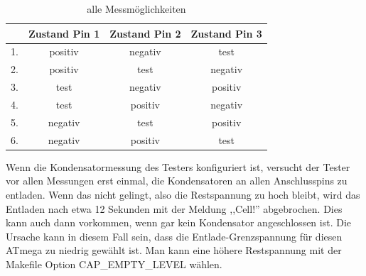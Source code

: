 \begin{table}[H]
  \begin{center}
    \begin{tabular}{| l | c | c | c |}
    \hline
      & Zustand Pin 1 & Zustand Pin 2 & Zustand Pin 3 \\
    \hline
   1. & positiv    &  negativ   &  test \\
   2. & positiv    &  test      & negativ \\
   3. & test       &  negativ   & positiv \\
   4. & test       &  positiv   & negativ \\
   5. & negativ    &  test      & positiv \\
   6. & negativ    &  positiv   &  test  \\
    \hline
    \end{tabular}
  \end{center}
  \caption{alle Messmöglichkeiten}
  \label{tab:case} 
\end{table}

Wenn die Kondensatormessung des Testers konfiguriert ist, versucht der Tester vor allen Messungen erst einmal,
die Kondensatoren an allen Anschlusspins zu entladen. Wenn das nicht gelingt, also die Restspannung zu hoch bleibt,
wird das Entladen nach etwa 12 Sekunden mit der Meldung ,,Cell!'' abgebrochen. Dies kann auch dann vorkommen, wenn
gar kein Kondensator angeschlossen ist. Die Ursache kann in diesem Fall sein, dass die Entlade-Grenzspannung für diesen
ATmega zu niedrig gewählt ist. Man kann eine höhere Restspannung mit der Makefile Option CAP\_EMPTY\_LEVEL wählen.
